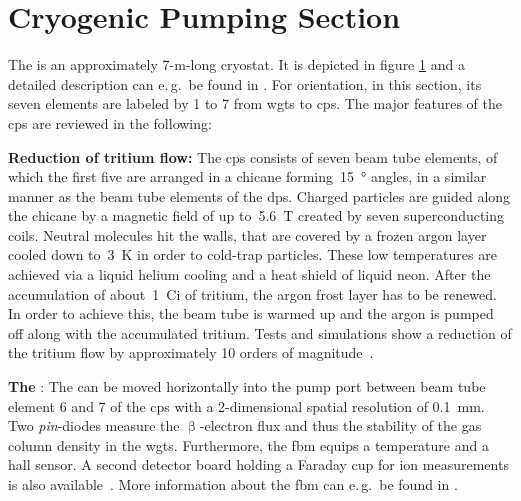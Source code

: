 \section{Cryogenic Pumping Section}
\label{sec:katrinExpSetupCryoPumpingSection}
\begin{figure}[t]
 \label{fig:katrinExpSetupCryoPumpingSection}
\end{figure}
The  is an approximately 7-m-long cryostat. It is depicted in figure \ref{fig:katrinExpSetupCryoPumpingSection} and a detailed description can e.\,g.~be found in \cite{Jansen2015}. For orientation, in this section, its seven elements are labeled by 1 to 7 from \gls{wgts} to \gls{cps}. The major features of the \gls{cps} are reviewed in the following:

{\par\textbf{Reduction of tritium flow:}
The \gls{cps} consists of seven beam tube elements, of which the first five are arranged in a chicane forming~\SI{15}{\degree} angles, in a similar manner as the beam tube elements of the \gls{dps}. Charged particles are guided along the chicane by a magnetic field of up to~\SI{5.6}{T} created by seven superconducting coils. Neutral molecules hit the walls, that are covered by a frozen argon layer cooled down to~\SI{3}{K} in order to cold-trap particles. These low temperatures are achieved via a liquid helium cooling and a heat shield of liquid neon. After the accumulation of about~\SI{1}{Ci} of tritium, the argon frost layer has to be renewed. In order to achieve this, the beam tube is warmed up and the argon is pumped off along with the accumulated tritium. Tests and simulations show a reduction of the tritium flow by approximately 10 orders of magnitude~\cite{Jansen2015,Roettele2019}.}

{\par\textbf{The }: 
The  can be moved horizontally into the pump port between beam tube element 6 and 7 of the \gls{cps} with a 2-dimensional spatial resolution of \SI{0.1}{mm}. Two \textit{pin}-diodes measure the $\upbeta$-electron flux and thus the stability of the gas column density in the \gls{wgts}. Furthermore, the \gls{fbm} equips a temperature and a hall sensor. A second detector board holding a Faraday cup for ion measurements is also available~\cite{Klein2019}. More information about the \gls{fbm} can e.\,g.~be found in \cite{Ellinger2017,Ellinger2019}.}

